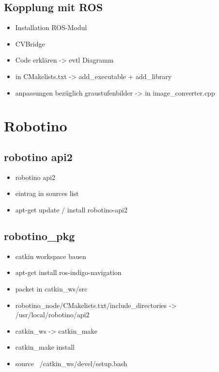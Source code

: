 		\subsection{Kopplung mit ROS}
			\begin{itemize}
				\item Installation ROS-Modul
				\item CVBridge
				\item Code erklären -> evtl Diagramm
				\item in CMakelists.txt -> add\_executable + add\_library
				\item anpassungen bezüglich graustufenbilder -> in image\_converter.cpp
			\end{itemize}
	\section{Robotino}
		\subsection{robotino api2}
		\begin{itemize}
		\item robotino api2
		\item eintrag in sources list
		\item apt-get update / install robotino-api2
		\end{itemize}
		\subsection{robotino\_pkg}
		\begin{itemize}
		\item catkin workspace bauen
		\item apt-get install ros-indigo-navigation
		\item packet in catkin\_ws/src
		\item robotino\_node/CMakelists.txt/include\_directories -> /usr/local/robotino/api2
		\item catkin\_ws -> catkin\_make
		\item catkin\_make install
		\item source ~/catkin\_ws/devel/setup.bash
		\end{itemize}
		
		